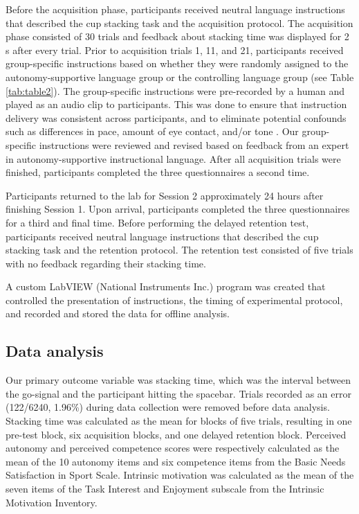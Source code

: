 \documentclass[man,floatsintext,donotrepeattitle,letterpaper,12pt]{apa7}
\begin{document}
Before the acquisition phase, participants received neutral language instructions that described the cup stacking task and the acquisition protocol. The acquisition phase consisted of 30 trials and feedback about stacking time was displayed for 2 s after every trial. Prior to acquisition trials 1, 11, and 21, participants received group-specific instructions based on whether they were randomly assigned to the autonomy-supportive language group or the controlling language group (see Table \ref{tab:table2}). The group-specific instructions were pre-recorded by a human and played as an audio clip to participants. This was done to ensure that instruction delivery was consistent across participants, and to eliminate potential confounds such as differences in pace, amount of eye contact, and/or tone \textcolor{blue}{\autocite[e.g.,][]{weinstein2018,van2020}}. Our group-specific instructions were reviewed and revised based on feedback from an expert in autonomy-supportive instructional language.\footnotemark{} After all acquisition trials were finished, participants completed the three questionnaires a second time.

Participants returned to the lab for Session 2 approximately 24 hours after finishing Session 1. Upon arrival, participants completed the three questionnaires for a third and final time. Before performing the delayed retention test, participants received neutral language instructions that described the cup stacking task and the retention protocol. The retention test consisted of five trials with no feedback regarding their stacking time.

A custom LabVIEW (National Instruments Inc.) program was created that controlled the presentation of instructions, the timing of experimental protocol, and recorded and stored the data for offline analysis.

\subsection{Data analysis}

Our primary outcome variable was stacking time, which was the interval between the go-signal and the participant hitting the spacebar. Trials recorded as an error (122/6240, 1.96\%) during data collection were removed before data analysis. Stacking time was calculated as the mean for blocks of five trials, resulting in one pre-test block, six acquisition blocks, and one delayed retention block. Perceived autonomy and perceived competence scores were respectively calculated as the mean of the 10 autonomy items and six competence items from the Basic Needs Satisfaction in Sport Scale. Intrinsic motivation was calculated as the mean of the seven items of the Task Interest and Enjoyment subscale from the Intrinsic Motivation Inventory.
\end{document}
